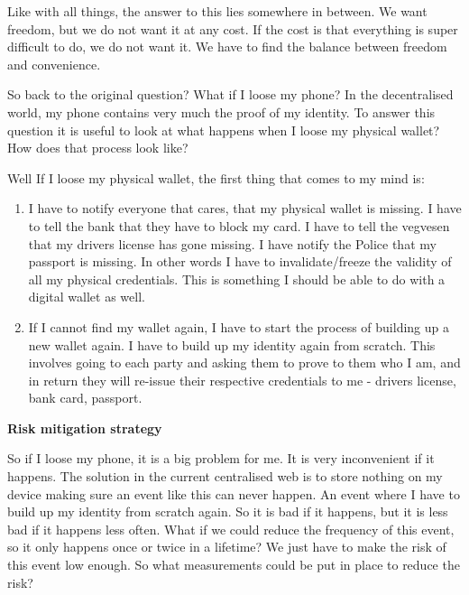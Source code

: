 Like with all things, the answer to this lies somewhere in between. We
want freedom, but we do not want it at any cost. If the cost is that
everything is super difficult to do, we do not want it. We have to find
the balance between freedom and convenience.

So back to the original question? What if I loose my phone? In the
decentralised world, my phone contains very much the proof of my
identity. To answer this question it is useful to look at what happens
when I loose my physical wallet? How does that process look like?

Well If I loose my physical wallet, the first thing that comes to my
mind is:

\begin{enumerate}
\def\labelenumi{\arabic{enumi}.}
\tightlist
\item
  I have to notify everyone that cares, that my physical wallet is
  missing. I have to tell the bank that they have to block my card. I
  have to tell the vegvesen that my drivers license has gone missing. I
  have notify the Police that my passport is missing. In other words I
  have to invalidate/freeze the validity of all my physical credentials.
  This is something I should be able to do with a digital wallet as
  well.
\item
  If I cannot find my wallet again, I have to start the process of
  building up a new wallet again. I have to build up my identity again
  from scratch. This involves going to each party and asking them to
  prove to them who I am, and in return they will re-issue their
  respective credentials to me - drivers license, bank card, passport.
\end{enumerate}

\textbf{Risk mitigation strategy}

So if I loose my phone, it is a big problem for me. It is very
inconvenient if it happens. The solution in the current centralised web
is to store nothing on my device making sure an event like this can
never happen. An event where I have to build up my identity from scratch
again. So it is bad if it happens, but it is less bad if it happens less
often. What if we could reduce the frequency of this event, so it only
happens once or twice in a lifetime? We just have to make the risk of
this event low enough. So what measurements could be put in place to
reduce the risk?

